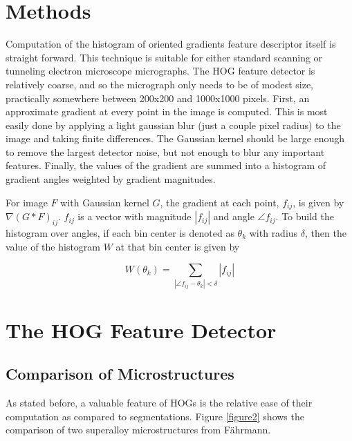 \documentclass[review]{elsarticle}
\begin{document}
	\section{Methods}\label{methodsandmaterials}
		Computation of the histogram of oriented gradients feature descriptor itself is straight forward. This technique is suitable for either standard scanning or tunneling electron microscope micrographs. The HOG feature detector is relatively coarse, and so the micrograph only needs to be of modest size, practically somewhere between 200x200 and 1000x1000 pixels. First, an approximate gradient at every point in the image is computed. This is most easily done by applying a light gaussian blur (just a couple pixel radius) to the image and taking finite differences. The Gaussian kernel should be large enough to remove the largest detector noise, but not enough to blur any important features. Finally, the values of the gradient are summed into a histogram of gradient angles weighted by gradient magnitudes.

		For image $F$ with Gaussian kernel $G$, the gradient at each point, $f_{ij}$, is given by $\nabla \left( G \ast F \right)_{ij}$. $f_{ij}$ is a vector with magnitude $\left| f_{ij} \right|$ and angle $\angle f_{ij}$. To build the histogram over angles, if each bin center is denoted as $\theta_k$ with radius $\delta$, then the value of the histogram $W$ at that bin center is given by

		\begin{equation}
			W \left( \theta_k \right) = \sum_{\left| \angle f_{ij} - \theta_k \right| < \delta} \left| f_{ij} \right|
		\end{equation}

	\section{The HOG Feature Detector}\label{hog}
	\subsection{Comparison of Microstructures}
	As stated before, a valuable feature of HOGs is the relative ease of their computation as compared to segmentations. Figure \ref{figure2} shows the comparison of two superalloy microstructures from F\"ahrmann\cite{faehrmann}.
\end{document}
